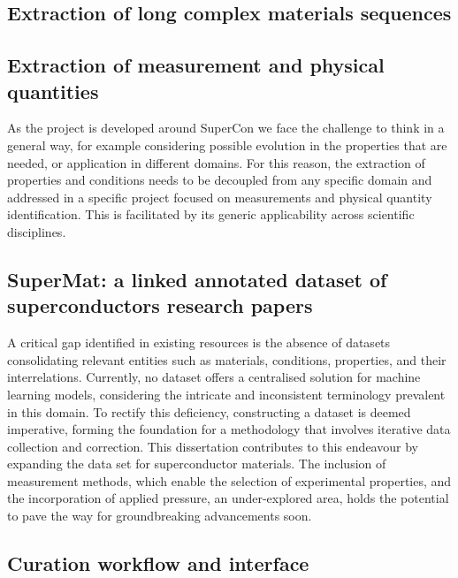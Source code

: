 \subsection{Extraction of long complex materials sequences}


\subsection{Extraction of measurement and physical quantities}
As the project is developed around SuperCon we face the challenge to think in a general way, for example considering possible evolution in the properties that are needed, or application in different domains. For this reason, the extraction of properties and conditions needs to be decoupled from any specific domain and addressed in a specific project focused on measurements and physical quantity identification.
This is facilitated by its generic applicability across scientific disciplines. 

\subsection{SuperMat: a linked annotated dataset of superconductors research papers}
A critical gap identified in existing resources is the absence of datasets consolidating relevant entities such as materials, conditions, properties, and their interrelations. 
Currently, no dataset offers a centralised solution for machine learning models, considering the intricate and inconsistent terminology prevalent in this domain. 
To rectify this deficiency, constructing a dataset is deemed imperative, forming the foundation for a methodology that involves iterative data collection and correction. This dissertation contributes to this endeavour by expanding the data set for superconductor materials. 
The inclusion of measurement methods, which enable the selection of experimental properties, and the incorporation of applied pressure, an under-explored area, holds the potential to pave the way for groundbreaking advancements soon.


\subsection{Curation workflow and interface}



